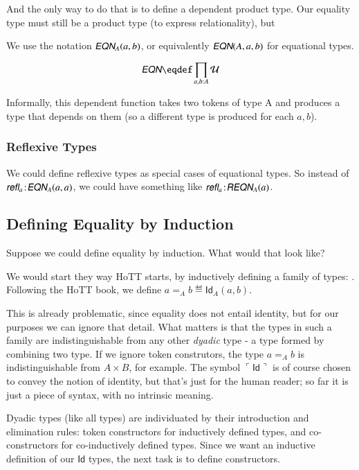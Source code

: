 And the only way to do that is to define a dependent product type. Our
equality type must still be a product type (to express relationality),
but

We use the notation \(\EQN_A(a,b)\), or equivalently \(\EQN(A,a,b)\)
for equational types.

\[\EQN \defeq \prod\limits_{\tjsmall{a,b}{A}}\Univ\]



Informally, this dependent function takes two tokens of type A and
produces a type that depends on them (so a different type is produced
for each \(a,b\)).

\subsubsection{Reflexive Types}

We could define reflexive types as special cases of equational types.
So instead of \( \tj{\refl_a}{\EQN_A(a,a)}\), we could have something like
\(\tj{\refl_a}{\REQN_A(a)}\).


\subsection{Defining Equality by Induction}

Suppose we could define equality by induction. What would that look
like?

We would start they way HoTT starts, by inductively defining a family
of types: . Following the HoTT book, we define
\(a=_Ab\eqdef\textsf{Id}_A(a,b)\).

This is already problematic, since equality does not entail identity,
but for our purposes we can ignore that detail. What matters is that
the types in such a family are indistinguishable from any other
\textit{dyadic} type - a type formed by combining two type. If we
ignore token construtors, the type \(a=_Ab\) is indistinguishable from
\(A\times B\), for example. The symbol
\(\ulcorner\textsf{Id}\urcorner\) is of course chosen to convey the
notion of identity, but that's just for the human reader; so far it is
just a piece of syntax, with no intrinsic meaning.

Dyadic types (like all types) are individuated by their introduction
and elimination rules: token constructors for inductively defined
types, and co-constructors for co-inductively defined types. Since we
want an inductive definition of our \(\textsf{Id}\) types, the next
task is to define constructors.

